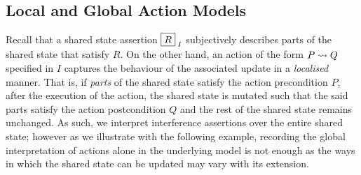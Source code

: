 \subsection{Local and Global Action Models}\label{subsec:localGlobalActionModels}
Recall that a shared state assertion $\boxed{R}_{\; I}$ subjectively describes parts of the shared state that satisfy $R$. On the other hand, an action of the form $P \rightsquigarrow Q$ specified in $I$ captures the behaviour of the associated update in a \emph{localised} manner. That is, if \emph{parts} of the shared state satisfy the action precondition $P$, after the execution of the action, the shared state is mutated such that the said parts satisfy the action postcondition $Q$ and the rest of the shared state remains unchanged. As such, we interpret interference assertions over the entire shared state; however as we illustrate with the following example, recording the global interpretation of actions alone in the underlying model is not enough as the ways in which the shared state can be updated may vary with its extension. 
%
